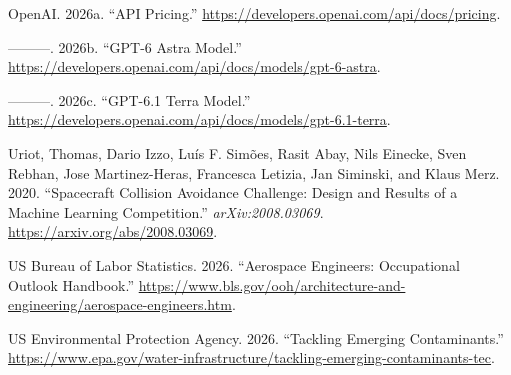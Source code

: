 \documentclass[11pt,letterpaper]{article}
\newenvironment{CSLReferences}[2]{\setlength{\parindent}{0pt}\setlength{\parskip}{0.6em}\small}{ }
\begin{document}
\begin{CSLReferences}{1}{0}
\leavevmode{}%
OpenAI. 2026a. {``API Pricing.''}
\url{https://developers.openai.com/api/docs/pricing}.

\leavevmode{}%
---------. 2026b. {``GPT-6 Astra Model.''}
\url{https://developers.openai.com/api/docs/models/gpt-6-astra}.

\leavevmode{}%
---------. 2026c. {``GPT-6.1 Terra Model.''}
\url{https://developers.openai.com/api/docs/models/gpt-6.1-terra}.

\leavevmode{}%
Uriot, Thomas, Dario Izzo, Luís F. Simões, Rasit Abay, Nils Einecke,
Sven Rebhan, Jose Martinez-Heras, Francesca Letizia, Jan Siminski, and
Klaus Merz. 2020. {``Spacecraft Collision Avoidance Challenge: Design
and Results of a Machine Learning Competition.''}
\emph{arXiv:2008.03069}. \url{https://arxiv.org/abs/2008.03069}.

\leavevmode{}%
US Bureau of Labor Statistics. 2026. {``Aerospace Engineers:
Occupational Outlook Handbook.''}
\url{https://www.bls.gov/ooh/architecture-and-engineering/aerospace-engineers.htm}.

\leavevmode{}%
US Environmental Protection Agency. 2026. {``Tackling Emerging
Contaminants.''}
\url{https://www.epa.gov/water-infrastructure/tackling-emerging-contaminants-tec}.

\end{CSLReferences}
\end{document}
